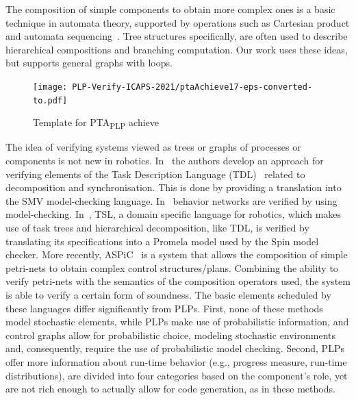 \documentclass[letterpaper]{article}
\begin{document}
The composition of simple components to obtain more complex ones is a basic technique in automata theory, supported by operations such as Cartesian product and automata sequencing~\citep{automatabook}. Tree structures specifically, are often used to describe hierarchical compositions and branching computation. Our work uses these ideas, but supports general graphs with loops.

\begin{figure}[h]
\centering
\texttt{[image: PLP-Verify-ICAPS-2021/ptaAchieve17-eps-converted-to.pdf]}
\caption{Template for PTA\textsubscript{PLP} achieve}
\label{fig:ptaAchieve}
\vspace{-0.0cm}
\end{figure}

The idea of verifying systems viewed as trees or graphs of processes or components is not new in robotics. 
In~\citet{SPS00} the authors develop an approach for verifying elements of the Task Description Language (TDL)~\citep{TCA} related to decomposition and synchronisation. 
This is done by providing a translation into the SMV model-checking language. In~\citet{AKRB13} behavior networks are verified by using model-checking. In~\citet{vTSL}, TSL, a domain specific language for robotics, which makes use of task trees and hierarchical decomposition, like TDL, is verified by translating its specifications into a Promela model used by the Spin model checker. 
More recently, ASPiC~\cite{ASPiC} is a system that allows the composition of simple petri-nets to obtain complex control structures/plans.
Combining the ability to verify petri-nets with the semantics of the composition operators used, the system is able to verify a certain form of soundness.
The basic elements scheduled by these languages differ significantly from PLPs.
First, none of these methods model stochastic elements, while PLPs make use of probabilistic information, and control graphs allow for probabilistic choice, modeling stochastic environments and, consequently, require the use of probabilistic model checking. Second, PLPs offer more information about run-time behavior (e.g., progress measure, run-time distributions), are divided into four categories based on the component's role, yet are not rich enough to actually allow for code generation, as in these methods.  
\end{document}
